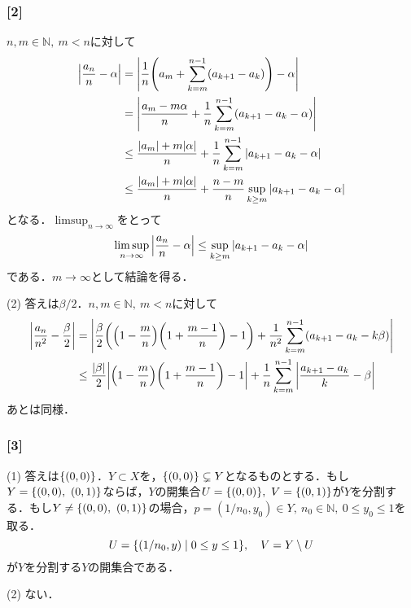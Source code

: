 \documentclass[a4j]{ltjsarticle}
\newcommand{\Nset}{\mathbb{N}}
\newcommand{\1}{\mathbbm{1}}
\numberwithin{equation}{section}
\theoremstyle{definition}
\begin{document}
\subsubsection*{[2]}
$n,m\in\Nset,\ m<n$に対して
\begin{align}
    \abs{\frac{a_n}{n}-\alpha}
    &= \abs{\frac{1}{n}\qty(a_m+\sum_{k=m}^{n-1}(a_{k+1}-a_k))-\alpha}\\
    &=\abs{\frac{a_m-m\alpha}{n}+\frac{1}{n}\sum_{k=m}^{n-1}(a_{k+1}-a_k-\alpha)}\\
    &\leq \frac{\abs{a_m}+m\abs{\alpha}}{n}+\frac{1}{n}\sum_{k=m}^{n-1}\abs{a_{k+1}-a_k-\alpha}\\
    &\leq \frac{\abs{a_m}+m\abs{\alpha}}{n}+\frac{n-m}{n}\sup_{k\geq m}\abs{a_{k+1}-a_k-\alpha}
\end{align}
となる．$\limsup_{n\to\infty}$をとって
\begin{equation}
    \limsup_{n\to\infty}\abs{\frac{a_n}{n}-\alpha}\leq \sup_{k\geq m}\abs{a_{k+1}-a_k-\alpha}
\end{equation}
である．$m\to\infty$として結論を得る．

(2) 答えは$\beta/2$．$n,m\in\Nset,\ m<n$に対して
\begin{align}
    \abs{\frac{a_n}{n^2}-\frac{\beta}{2}}
    &=\abs{\frac{\beta}{2}\qty(\qty(1-\frac{m}{n})\qty(1+\frac{m-1}{n})-1)+\frac{1}{n^2}\sum_{k=m}^{n-1}(a_{k+1}-a_{k}-k\beta)}\\
    &\leq \frac{\abs{\beta}}{2}\abs{\qty(1-\frac{m}{n})\qty(1+\frac{m-1}{n})-1}+\frac{1}{n}\sum_{k=m}^{n-1}\abs{\frac{a_{k+1}-a_{k}}{k}-\beta} 
\end{align}
あとは同様．

\subsubsection*{[3]}
(1) 答えは$\qty{(0,0)}$．$Y\subset X$を，$\qty{(0,0)}\subsetneq Y$となるものとする．もし$Y=\qty{(0,0),\ (0,1)}$ならば，$Y$の開集合$U=\qty{(0,0)},\ V=\qty{(0,1)}$が$Y$を分割する．もし$Y\neq \qty{(0,0),\ (0,1)}$の場合，$p=(1/n_0,y_0)\in Y,\ n_0\in\Nset,\ 0\leq y_0\leq 1$を取る．
\begin{equation}
    U=\qty{(1/n_0,y)\mid 0\leq y\leq 1},\quad V=Y\setminus U 
\end{equation}
が$Y$を分割する$Y$の開集合である．

(2) ない．
\end{document}
